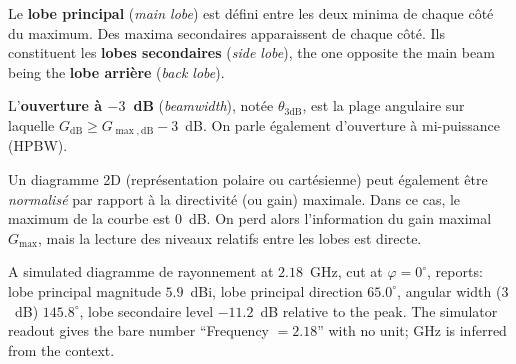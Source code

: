 \begin{figure}[h!]
  \centering
\end{figure}

Le \textbf{lobe principal} (\textit{main lobe}) est défini entre les deux
minima de chaque côté du maximum. Des maxima secondaires apparaissent de chaque
côté. Ils constituent les \textbf{lobes secondaires} (\textit{side lobe}), the
one opposite the main beam being the \textbf{lobe arrière}
(\textit{back lobe}).

\begin{definition}[Ouverture à $-3$~dB]
  L'\textbf{ouverture à $-3$~dB} (\textit{beamwidth}), notée
  $\theta_{3\mathrm{dB}}$, est la plage angulaire sur laquelle
  $G_{\mathrm{dB}} \ge G_{\max,\mathrm{dB}} - 3$~dB. On parle également
  d'ouverture à mi-puissance (HPBW).
\end{definition}

Un diagramme 2D (représentation polaire ou cartésienne) peut également être
\emph{normalisé} par rapport à la directivité (ou gain) maximale. Dans ce cas,
le maximum de la courbe est $0$~dB. On perd alors l'information du gain
maximal $G_{\max}$, mais la lecture des niveaux relatifs entre les lobes est
directe.

\begin{example}
  A simulated diagramme de rayonnement at $2.18$~GHz, cut at
  $\varphi = 0^\circ$, reports: lobe principal magnitude $5.9$~dBi, lobe
  principal direction $65.0^\circ$, angular width ($3$~dB) $145.8^\circ$, lobe
  secondaire level $-11.2$~dB relative to the peak. The simulator readout
  gives the bare number ``Frequency $= 2.18$'' with no unit; GHz is inferred
  from the context.
\end{example}

